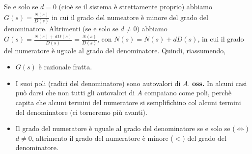 \newline
Se e solo se $d=0$ (cioè se il sistema è strettamente proprio) abbiamo $G(s) = \frac{\bar{N}(s)}{D(s)}$ in cui il grado del numeatore è minore del grado del denominatore.\newline
Altrimenti (se e solo se $d\neq 0$) abbiamo $G(s) = \frac{\bar{N}(s) + dD(s)}{D(s)} = \frac{N(s)}{D(s)}$, con $N(s) = \bar{N}(s) +dD(s)$, in cui il grado del numeratore è uguale al grado del denominatore.\newline
\newline
Quindi, riassumendo,
\begin{itemize}
    \item $G(s)$ è razionale fratta.
    \item I suoi poli (radici del denominatore) sono autovalori di $A$.\newline
    \textbf{oss.} In alcuni casi può darsi che non tutti gli autovalori di $A$ compaiano come poli, perchè capita che alcuni termini del numeratore si semplifichino col alcuni termini del denominatore (ci torneremo più avanti).
    \item Il grado del numeratore è uguale al grado del denominatore se e solo se ($\Leftrightarrow$) $d\neq 0$, altrimento il grado del numeratore è minore ($<$) del grado del denominatore.
\end{itemize}
